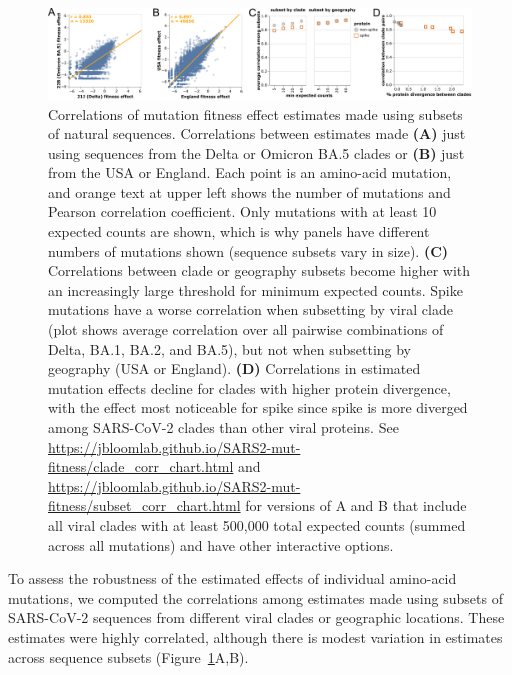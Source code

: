 \documentclass[9pt,twocolumn,twoside]{gsajnl_modified}
\begin{document}
\begin{figure}
\centering
\includegraphics[width=\linewidth]{figs/corr.png}
\caption{
Correlations of mutation fitness effect estimates made using subsets of natural sequences.
Correlations between estimates made {\bf (A)} just using sequences from the Delta or Omicron BA.5 clades or {\bf (B)} just from the USA or England.
Each point is an amino-acid mutation, and orange text at upper left shows the number of mutations and Pearson correlation coefficient.
Only mutations with at least 10 expected counts are shown, which is why panels have different numbers of mutations shown (sequence subsets vary in size).
{\bf (C)} Correlations between clade or geography subsets become higher with an increasingly large threshold for minimum expected counts.
Spike mutations have a worse correlation when subsetting by viral clade (plot shows average correlation over all pairwise combinations of Delta, BA.1, BA.2, and BA.5), but not when subsetting by geography (USA or England).
{\bf (D)} Correlations in estimated mutation effects decline for clades with higher protein divergence, with the effect most noticeable for spike since spike is more diverged among SARS-CoV-2 clades than other viral proteins.
See \url{https://jbloomlab.github.io/SARS2-mut-fitness/clade_corr_chart.html} and \url{https://jbloomlab.github.io/SARS2-mut-fitness/subset_corr_chart.html} for versions of A and B that include all viral clades with at least 500,000 total expected counts (summed across all mutations) and have other interactive options.
\label{fig:corr}
}
\end{figure}

To assess the robustness of the estimated effects of individual amino-acid mutations, we computed the correlations among estimates made using subsets of SARS-CoV-2 sequences from different viral clades or geographic locations.
These estimates were highly correlated, although there is modest variation in estimates across sequence subsets (Figure~\ref{fig:corr}A,B).
\end{document}
